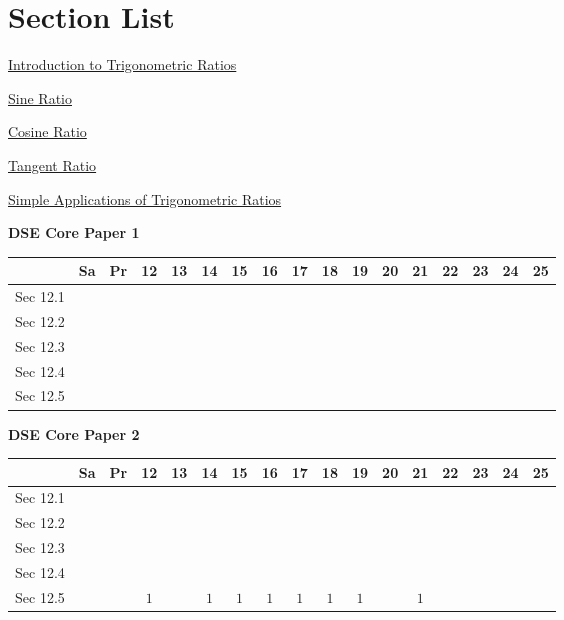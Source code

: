 \documentclass[12pt, a4paper]{article}
\begin{document}
\section*{Section List}
\begin{enumx}[label=Sec 12.\arabic*\ ]
\item \hyperref[section:2-12-1]{Introduction to Trigonometric Ratios}
\item \hyperref[section:2-12-2]{Sine Ratio}
\item \hyperref[section:2-12-3]{Cosine Ratio}
\item \hyperref[section:2-12-4]{Tangent Ratio}
\item \hyperref[section:2-12-5]{Simple Applications of Trigonometric Ratios}
\end{enumx}
\begin{absolutelynopagebreak}
\begin{center}
\textbf{DSE Core Paper 1}
\end{center}
\begin{center}
\begin{tabular}{|l|c|c|c|c|c|c|c|c|c|c|c|c|c|c|c|c|}
\hline
        & Sa & Pr & 12 & 13 & 14 & 15 & 16 & 17 & 18 & 19 & 20 & 21 & 22 & 23 & 24 & 25 \\\hline\hline
Sec 12.1 &  &  &  &  &  &  &  &  &  &  &  &  &  &  &  &  \\\hline
Sec 12.2 &  &  &  &  &  &  &  &  &  &  &  &  &  &  &  &  \\\hline
Sec 12.3 &  &  &  &  &  &  &  &  &  &  &  &  &  &  &  &  \\\hline
Sec 12.4 &  &  &  &  &  &  &  &  &  &  &  &  &  &  &  &  \\\hline
Sec 12.5 &  &  &  &  &  &  &  &  &  &  &  &  &  &  &  &  \\\hline
\end{tabular}
\end{center}
\end{absolutelynopagebreak}
\begin{absolutelynopagebreak}
\begin{center}
\textbf{DSE Core Paper 2}
\end{center}
\begin{center}
\begin{tabular}{|l|c|c|c|c|c|c|c|c|c|c|c|c|c|c|c|c|}
\hline
        & Sa & Pr & 12 & 13 & 14 & 15 & 16 & 17 & 18 & 19 & 20 & 21 & 22 & 23 & 24 & 25 \\\hline\hline
Sec 12.1 &  &  &  &  &  &  &  &  &  &  &  &  &  &  &  &  \\\hline
Sec 12.2 &  &  &  &  &  &  &  &  &  &  &  &  &  &  &  &  \\\hline
Sec 12.3 &  &  &  &  &  &  &  &  &  &  &  &  &  &  &  &  \\\hline
Sec 12.4 &  &  &  &  &  &  &  &  &  &  &  &  &  &  &  &  \\\hline
Sec 12.5 &  &  &  $1$ &  &  $1$ &  $1$ &  $1$ &  $1$ &  $1$ &  $1$ &  &  $1$ &  &  &  &  \\\hline
\end{tabular}
\end{center}
\end{absolutelynopagebreak}
\end{document}
